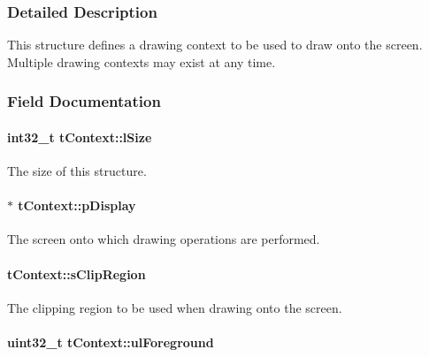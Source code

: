 \subsubsection{Detailed Description}
This structure defines a drawing context to be used to draw onto the screen. Multiple drawing contexts may exist at any time. 

\subsubsection{Field Documentation}
\paragraph[{l\+Size}]{\setlength{\rightskip}{0pt plus 5cm}int32\+\_\+t t\+Context\+::l\+Size}\label{structt_context_a799968a6a85d60435e563b41673771bb}


The size of this structure. 

\paragraph[{p\+Display}]{$\ast$ t\+Context\+::p\+Display}\label{structt_context_a98adcde3d5648a0b60525fdd1b5484d7}


The screen onto which drawing operations are performed. 

\paragraph[{s\+Clip\+Region}]{ t\+Context\+::s\+Clip\+Region}\label{structt_context_af2001db845ff3005adff3b745b1fdf4b}


The clipping region to be used when drawing onto the screen. 

\paragraph[{ul\+Foreground}]{\setlength{\rightskip}{0pt plus 5cm}uint32\+\_\+t t\+Context\+::ul\+Foreground}\label{structt_context_ac1ed552aa3a7402a1d6acf69947304aa}


